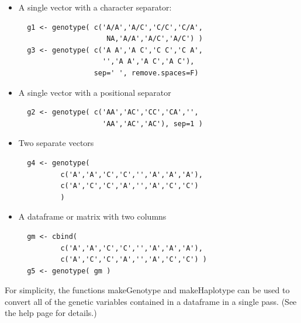\documentclass{report}
\begin{document}
\begin{itemize} 
\item A single vector with a character separator:
  {\small
\begin{verbatim} 
  g1 <- genotype( c('A/A','A/C','C/C','C/A',
                     NA,'A/A','A/C','A/C') )
  g3 <- genotype( c('A A','A C','C C','C A',
                    '','A A','A C','A C'), 
                  sep=' ', remove.spaces=F)
\end{verbatim}
}  


\item A single vector with a positional separator
  {\small
\begin{verbatim}
  g2 <- genotype( c('AA','AC','CC','CA','',
                    'AA','AC','AC'), sep=1 )
\end{verbatim}
}  


\item Two separate vectors
  {\small
\begin{verbatim}
  g4 <- genotype( 
          c('A','A','C','C','','A','A','A'),
          c('A','C','C','A','','A','C','C')
          )
\end{verbatim}
}  

\item A dataframe or matrix with two columns
  {\small
\begin{verbatim}
  gm <- cbind( 
          c('A','A','C','C','','A','A','A'),
          c('A','C','C','A','','A','C','C') ) 
  g5 <- genotype( gm )
\end{verbatim}
}  
\end{itemize}

For simplicity, the functions makeGenotype and makeHaplotype can be
used to convert all of the genetic variables contained in a dataframe
in a single pass.  (See the help page for details.)
\end{document}
